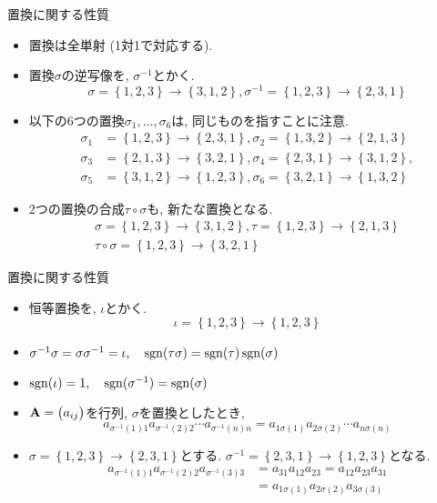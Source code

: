 \documentclass[dvipdfmx,notheorems,t]{beamer}
\begin{document}
\begin{frame}{置換に関する性質}
\begin{itemize}
  \item 置換は全単射 (1対1で対応する).
  \item 置換$\sigma$の逆写像を, $\sigma^{-1}$とかく.
  $$\sigma = \left\{ 1, 2, 3 \right\} \to \left\{ 3, 1, 2 \right\},
    \sigma^{-1} = \left\{ 1, 2, 3 \right\} \to \left\{ 2, 3, 1 \right\}$$
  \item 以下の6つの置換$\sigma_1, \ldots, \sigma_6$は, 同じものを指すことに注意.
  \begin{align*}
    \sigma_1 &= \left\{ 1, 2, 3 \right\} \to \left\{ 2, 3, 1 \right\},
    \sigma_2 = \left\{ 1, 3, 2 \right\} \to \left\{ 2, 1, 3 \right\} \\
    \sigma_3 &= \left\{ 2, 1, 3 \right\} \to \left\{ 3, 2, 1 \right\},
    \sigma_4 = \left\{ 2, 3, 1 \right\} \to \left\{ 3, 1, 2 \right\}, \\
    \sigma_5 &= \left\{ 3, 1, 2 \right\} \to \left\{ 1, 2, 3 \right\},
    \sigma_6 = \left\{ 3, 2, 1 \right\} \to \left\{ 1, 3, 2 \right\}
  \end{align*}
  \item 2つの置換の合成$\tau \circ \sigma$も, 新たな置換となる.
  \begin{gather*}
    \sigma = \left\{ 1, 2, 3 \right\} \to \left\{ 3, 1, 2 \right\},
    \tau = \left\{ 1, 2, 3 \right\} \to \left\{ 2, 1, 3 \right\} \\
    \tau \circ \sigma = \left\{ 1, 2, 3 \right\} \to \left\{ 3, 2, 1 \right\}
  \end{gather*}
\end{itemize}
\end{frame}

\begin{frame}{置換に関する性質}
\begin{itemize}
  \item 恒等置換を, $\iota$とかく.
  $$\iota = \left\{ 1, 2, 3 \right\} \to \left\{ 1, 2, 3 \right\}$$
  \item $\sigma^{-1} \sigma = \sigma \sigma^{-1} = \iota, \quad \operatorname{sgn}(\tau \sigma) = \operatorname{sgn}(\tau) \operatorname{sgn}(\sigma)$
  \item $\operatorname{sgn}(\iota) = 1, \quad \operatorname{sgn}(\sigma^{-1}) = \operatorname{sgn}(\sigma)$
  \item $\vb{A} = \mqty(a_{ij})$を行列, $\sigma$を置換としたとき,
  $$a_{\sigma^{-1}(1) 1} a_{\sigma^{-1}(2) 2} \cdots a_{\sigma^{-1}(n) n}
    = a_{1 \sigma(1)} a_{2 \sigma(2)} \cdots a_{n \sigma(n)}$$
  \item $\sigma = \left\{ 1, 2, 3 \right\} \to \left\{ 2, 3, 1 \right\}$とする.
  $\sigma^{-1} = \left\{ 2, 3, 1 \right\} \to \left\{ 1, 2, 3 \right\}$となる.
  \begin{align*}
    a_{\sigma^{-1}(1) 1} a_{\sigma^{-1}(2) 2} a_{\sigma^{-1}(3) 3}
      &= a_{31} a_{12} a_{23} = a_{12} a_{23} a_{31} \\
      &= a_{1 \sigma(1)} a_{2 \sigma(2)} a_{3 \sigma(3)}
  \end{align*}
\end{itemize}
\end{frame}
\end{document}
